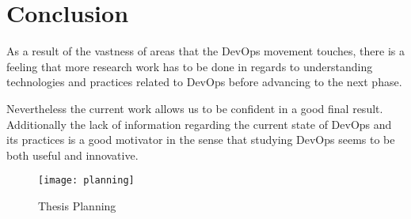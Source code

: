 \chapter{ Conclusion } \label{chap:conclusion}

 As a result of the vastness of areas that the DevOps movement touches, there is a feeling that more research work has to be done in regards to understanding technologies and practices related to DevOps before advancing to the next phase. 
 
 Nevertheless the current work allows us to be confident in a good final result. Additionally the lack of information regarding the current state of DevOps and its practices is a good motivator in the sense that studying DevOps seems to be both useful and innovative.
 
 
 \begin{figure}[!ht]
  \caption{Thesis Planning}
  \centering
   \texttt{[image: planning]} \label{Thesis Planning}
\end{figure}
 
 